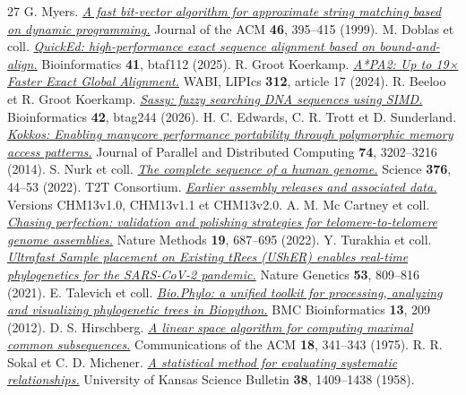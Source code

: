 \begin{thebibliography}{27}
 G. Myers. \href{https://doi.org/10.1145/316542.316550}{\emph{A fast bit-vector algorithm for approximate string matching based on dynamic programming.}} Journal of the ACM \textbf{46}, 395--415 (1999).
 M. Doblas et coll. \href{https://doi.org/10.1093/bioinformatics/btaf112}{\emph{QuickEd: high-performance exact sequence alignment based on bound-and-align.}} Bioinformatics \textbf{41}, btaf112 (2025).
 R. Groot Koerkamp. \href{https://doi.org/10.4230/LIPIcs.WABI.2024.17}{\emph{A*PA2: Up to 19× Faster Exact Global Alignment.}} WABI, LIPIcs \textbf{312}, article 17 (2024).
 R. Beeloo et R. Groot Koerkamp. \href{https://doi.org/10.1093/bioinformatics/btag244}{\emph{Sassy: fuzzy searching DNA sequences using SIMD.}} Bioinformatics \textbf{42}, btag244 (2026).
 H. C. Edwards, C. R. Trott et D. Sunderland. \href{https://doi.org/10.1016/j.jpdc.2014.07.003}{\emph{Kokkos: Enabling manycore performance portability through polymorphic memory access patterns.}} Journal of Parallel and Distributed Computing \textbf{74}, 3202--3216 (2014).
 S. Nurk et coll. \href{https://doi.org/10.1126/science.abj6987}{\emph{The complete sequence of a human genome.}} Science \textbf{376}, 44--53 (2022).
 T2T Consortium. \href{https://github.com/marbl/CHM13/blob/master/Earlier_assembly_releases_and_associated_data.md}{\emph{Earlier assembly releases and associated data.}} Versions CHM13v1.0, CHM13v1.1 et CHM13v2.0.
 A. M. Mc Cartney et coll. \href{https://doi.org/10.1038/s41592-022-01440-3}{\emph{Chasing perfection: validation and polishing strategies for telomere-to-telomere genome assemblies.}} Nature Methods \textbf{19}, 687--695 (2022).
 Y. Turakhia et coll. \href{https://doi.org/10.1038/s41588-021-00862-7}{\emph{Ultrafast Sample placement on Existing tRees (UShER) enables real-time phylogenetics for the SARS-CoV-2 pandemic.}} Nature Genetics \textbf{53}, 809--816 (2021).
 E. Talevich et coll. \href{https://doi.org/10.1186/1471-2105-13-209}{\emph{Bio.Phylo: a unified toolkit for processing, analyzing and visualizing phylogenetic trees in Biopython.}} BMC Bioinformatics \textbf{13}, 209 (2012).
 D. S. Hirschberg. \href{https://doi.org/10.1145/360825.360861}{\emph{A linear space algorithm for computing maximal common subsequences.}} Communications of the ACM \textbf{18}, 341--343 (1975).
 R. R. Sokal et C. D. Michener. \href{https://www.biodiversitylibrary.org/part/385476}{\emph{A statistical method for evaluating systematic relationships.}} University of Kansas Science Bulletin \textbf{38}, 1409--1438 (1958).

\end{thebibliography}
